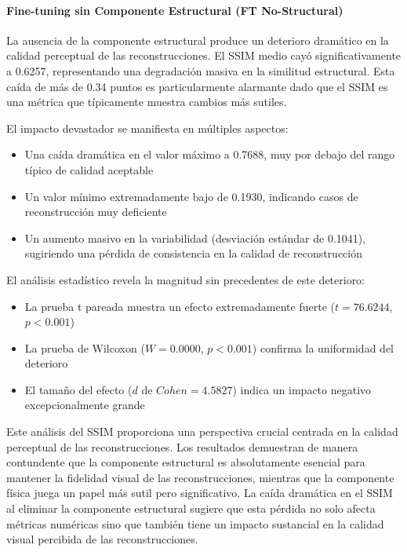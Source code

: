\paragraph{Fine-tuning sin Componente Estructural (FT No-Structural)}
La ausencia de la componente estructural produce un deterioro dramático en la calidad perceptual de las reconstrucciones. El SSIM medio cayó significativamente a 0.6257, representando una degradación masiva en la similitud estructural. Esta caída de más de 0.34 puntos es particularmente alarmante dado que el SSIM es una métrica que típicamente muestra cambios más sutiles.

El impacto devastador se manifiesta en múltiples aspectos:

\begin{itemize}
    \item Una caída dramática en el valor máximo a 0.7688, muy por debajo del rango típico de calidad aceptable
    \item Un valor mínimo extremadamente bajo de 0.1930, indicando casos de reconstrucción muy deficiente
    \item Un aumento masivo en la variabilidad (desviación estándar de 0.1041), sugiriendo una pérdida de consistencia en la calidad de reconstrucción
\end{itemize}

El análisis estadístico revela la magnitud sin precedentes de este deterioro:

\begin{itemize}
    \item La prueba t pareada muestra un efecto extremadamente fuerte ($t = 76.6244$, $p < 0.001$)
    \item La prueba de Wilcoxon ($W = 0.0000$, $p < 0.001$) confirma la uniformidad del deterioro
    \item El tamaño del efecto ($d$ de $Cohen = 4.5827$) indica un impacto negativo excepcionalmente grande
\end{itemize}

Este análisis del SSIM proporciona una perspectiva crucial centrada en la calidad perceptual de las reconstrucciones. Los resultados demuestran de manera contundente que la componente estructural es absolutamente esencial para mantener la fidelidad visual de las reconstrucciones, mientras que la componente física juega un papel más sutil pero significativo. La caída dramática en el SSIM al eliminar la componente estructural sugiere que esta pérdida no solo afecta métricas numéricas sino que también tiene un impacto sustancial en la calidad visual percibida de las reconstrucciones.

